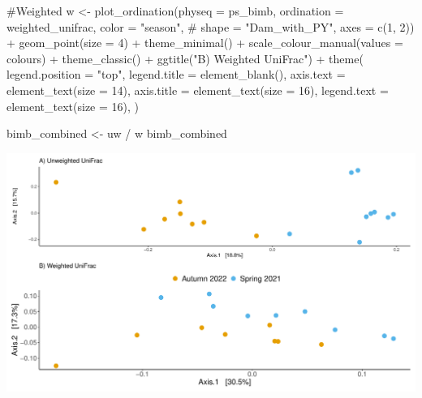 \documentclass[
  letterpaper,
  DIV=11,
  numbers=noendperiod]{scrartcl}
\newenvironment{Shaded}{\begin{snugshade}}{\end{snugshade}}
\newcommand{\AttributeTok}[1]{\textcolor[rgb]{0.40,0.45,0.13}{#1}}
\newcommand{\CommentTok}[1]{\textcolor[rgb]{0.37,0.37,0.37}{#1}}
\newcommand{\DecValTok}[1]{\textcolor[rgb]{0.68,0.00,0.00}{#1}}
\newcommand{\FunctionTok}[1]{\textcolor[rgb]{0.28,0.35,0.67}{#1}}
\newcommand{\NormalTok}[1]{\textcolor[rgb]{0.00,0.23,0.31}{#1}}
\newcommand{\OtherTok}[1]{\textcolor[rgb]{0.00,0.23,0.31}{#1}}
\newcommand{\SpecialCharTok}[1]{\textcolor[rgb]{0.37,0.37,0.37}{#1}}
\newcommand{\StringTok}[1]{\textcolor[rgb]{0.13,0.47,0.30}{#1}}
\begin{document}
\begin{Shaded}
\begin{Highlighting}[]
\CommentTok{\#Weighted}
\NormalTok{w }\OtherTok{\textless{}{-}} \FunctionTok{plot\_ordination}\NormalTok{(}\AttributeTok{physeq =}\NormalTok{ ps\_bimb,}
                \AttributeTok{ordination =}\NormalTok{ weighted\_unifrac,}
                \AttributeTok{color =} \StringTok{"season"}\NormalTok{,}
\CommentTok{\#                shape = "Dam\_with\_PY",}
                \AttributeTok{axes =} \FunctionTok{c}\NormalTok{(}\DecValTok{1}\NormalTok{, }\DecValTok{2}\NormalTok{)) }\SpecialCharTok{+}
  \FunctionTok{geom\_point}\NormalTok{(}\AttributeTok{size =} \DecValTok{4}\NormalTok{) }\SpecialCharTok{+}
  \FunctionTok{theme\_minimal}\NormalTok{() }\SpecialCharTok{+}
  \FunctionTok{scale\_colour\_manual}\NormalTok{(}\AttributeTok{values =}\NormalTok{ colours) }\SpecialCharTok{+}
  \FunctionTok{theme\_classic}\NormalTok{() }\SpecialCharTok{+}
  \FunctionTok{ggtitle}\NormalTok{(}\StringTok{"B) Weighted UniFrac"}\NormalTok{) }\SpecialCharTok{+}
  \FunctionTok{theme}\NormalTok{(}
    \AttributeTok{legend.position =} \StringTok{"top"}\NormalTok{,}
    \AttributeTok{legend.title =} \FunctionTok{element\_blank}\NormalTok{(),}
    \AttributeTok{axis.text =} \FunctionTok{element\_text}\NormalTok{(}\AttributeTok{size =} \DecValTok{14}\NormalTok{),}
    \AttributeTok{axis.title =} \FunctionTok{element\_text}\NormalTok{(}\AttributeTok{size =} \DecValTok{16}\NormalTok{),}
    \AttributeTok{legend.text =} \FunctionTok{element\_text}\NormalTok{(}\AttributeTok{size =} \DecValTok{16}\NormalTok{),}
\NormalTok{    ) }

\NormalTok{bimb\_combined }\OtherTok{\textless{}{-}}\NormalTok{ uw }\SpecialCharTok{/}\NormalTok{ w}
\NormalTok{bimb\_combined}
\end{Highlighting}
\end{Shaded}

\includegraphics{code_files/figure-pdf/unnamed-chunk-7-1.pdf}
\end{document}
